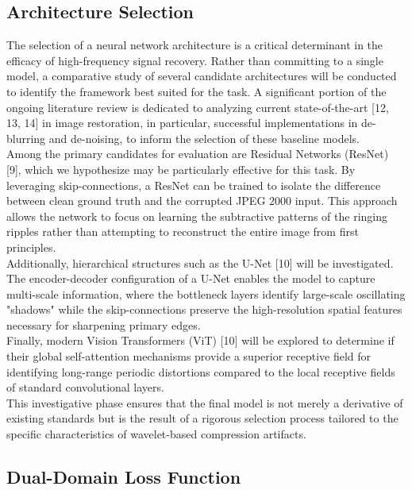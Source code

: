 \documentclass[12pt]{article}
\begin{document}
\subsection*{\small{Architecture Selection}}

\quad The selection of a neural network architecture is a critical determinant in the efficacy of high-frequency signal recovery. Rather than committing to a single model, a comparative study of several candidate architectures will be conducted to identify the framework best suited for the task. A significant portion of the ongoing literature review is dedicated to analyzing current state-of-the-art [12, 13, 14] in image restoration, in particular, successful implementations in de-blurring and de-noising, to inform the selection of these baseline models. \\

Among the primary candidates for evaluation are Residual Networks (ResNet) [9], which we hypothesize may be particularly effective for this task. By leveraging skip-connections, a ResNet can be trained to isolate the difference between clean ground truth and the corrupted JPEG 2000 input. This approach allows the network to focus on learning the subtractive patterns of the ringing ripples rather than attempting to reconstruct the entire image from first principles. \\

Additionally, hierarchical structures such as the U-Net [10] will be investigated. The encoder-decoder configuration of a U-Net enables the model to capture multi-scale information, where the bottleneck layers identify large-scale oscillating "shadows" while the skip-connections preserve the high-resolution spatial features necessary for sharpening primary edges. \\

Finally, modern Vision Transformers (ViT) [10] will be explored to determine if their global self-attention mechanisms provide a superior receptive field for identifying long-range periodic distortions compared to the local receptive fields of standard convolutional layers. \\

This investigative phase ensures that the final model is not merely a derivative of existing standards but is the result of a rigorous selection process tailored to the specific characteristics of wavelet-based compression artifacts.

\subsection*{\small{Dual-Domain Loss Function}}
\end{document}
